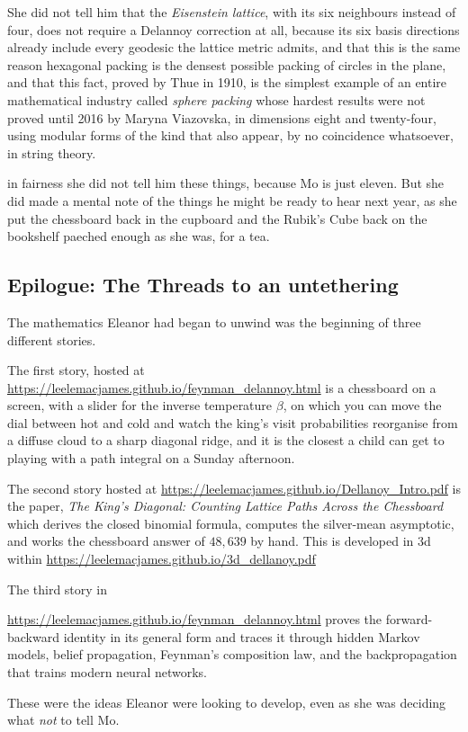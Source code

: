 She did not tell him that the \emph{Eisenstein lattice}, with its
six neighbours instead of four, does not require a Delannoy
correction at all, because its six basis directions already include
every geodesic the lattice metric admits, and that this is the same
reason hexagonal packing is the densest possible packing of circles
in the plane, and that this fact, proved by Thue in 1910, is the
simplest example of an entire mathematical industry called
\emph{sphere packing} whose hardest results were not proved until
2016 by Maryna Viazovska, in dimensions eight and twenty-four,
using modular forms of the kind that also appear, by no coincidence
whatsoever, in string theory.
 
in fairness she did not tell him these things, because Mo is just eleven. But she did made a mental note of the things he might be ready to hear next year, as she
put the chessboard back in the cupboard and the Rubik's Cube back on the bookshelf paeched enough as she was, for a tea.
  
\subsection*{Epilogue: The Threads to an untethering}
 
The mathematics Eleanor had began to unwind was the beginning of three
different stories.
 
The first story, hosted at \url{https://leelemacjames.github.io/feynman_delannoy.html} is a chessboard on a screen, with a slider for the inverse temperature $\beta$, on which you can move the dial between hot and cold and watch the king's visit probabilities reorganise from a diffuse cloud to a sharp diagonal ridge, and it
is the closest a child can get to playing with a path integral on a Sunday afternoon.

 
The second story  hosted at
\url{https://leelemacjames.github.io/Dellanoy_Intro.pdf} is the paper,
\emph{The King's Diagonal: Counting Lattice Paths Across the
Chessboard} which derives the closed binomial
formula, computes the silver-mean asymptotic, and works the chessboard answer of $48{,}639$ by hand. This is developed in 3d within 
\url{https://leelemacjames.github.io/3d_dellanoy.pdf}
 
The third story in 

\noindent
\url{https://leelemacjames.github.io/feynman_delannoy.html}
proves the forward-backward identity in its general form and traces it through hidden Markov models, belief propagation, Feynman's composition law, and the backpropagation that trains modern neural networks.

These were the ideas Eleanor were looking to develop, even as she was deciding what \emph{not} to tell Mo.
 
\newpage
